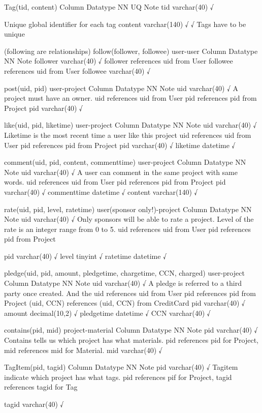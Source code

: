 Tag(tid, content)
Column
Datatype
NN
UQ
Note
tid
varchar(40)
√
 
Unique global identifier for each tag
content
varchar(140)
√
√
Tags have to be unique

(following are relationships)
follow(follower, followee) user-user
Column
Datatype
NN
Note
follower
varchar(40)
√
follower references uid from User
followee references uid from User
followee
varchar(40)
√

post(uid, pid) user-project
Column
Datatype
NN
Note
uid
varchar(40)
√
A project must have an owner.
uid references uid from User
pid references pid from Project
pid
varchar(40)
√


like(uid, pid, liketime) user-project
Column
Datatype
NN
Note
uid
varchar(40)
√
Liketime is the most recent time a user like this project
uid references uid from User
pid references pid from Project
pid
varchar(40)
√
liketime
datetime
√


comment(uid, pid, content, commenttime) user-project
Column
Datatype
NN
Note
uid
varchar(40)
√
A user can comment in the same project with same words.
uid references uid from User
pid references pid from Project
pid
varchar(40)
√
commenttime
datetime
√
content
varchar(140)
√

rate(uid, pid, level, ratetime) user(sponsor only!)-project
Column
Datatype
NN
Note
uid
varchar(40)
√
Only sponsors will be able to rate a project. Level of the rate is an integer range from 0 to 5.
uid references uid from User
pid references pid from Project
 
pid
varchar(40)
√
level
tinyint
√
ratetime
datetime
√


pledge(uid, pid, amount, pledgetime, chargetime, CCN, charged) user-project
Column
Datatype
NN
Note
uid
varchar(40)
√
A pledge is referred to a third party once created. And the
uid references uid from User
pid references pid from Project
(uid, CCN) references (uid, CCN) from CreditCard
pid
varchar(40)
√
amount
decimal(10,2)
√
pledgetime
datetime
√
CCN
varchar(40)
√

contains(pid, mid) project-material
Column
Datatype
NN
Note
pid
varchar(40)
√
Contains tells us which project has what materials. pid references pid for Project,
mid references mid for Material.
mid
varchar(40)
√


TagItem(pid, tagid)
Column
Datatype
NN
Note
pid
varchar(40)
√
 Tagitem indicate which project has what tags. pid references pif for Project, tagid references tagid for Tag
 
tagid
varchar(40)
√


